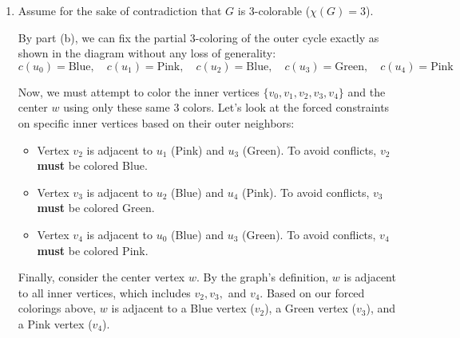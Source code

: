 \documentclass[11pt]{article}
\begin{document}
\begin{enumerate}[label=\textbf{(\alph*)}]
By utilizing the symmetry of the graph (rotating it), we can orient the $C_5$ such that the vertex assigned the unique color is placed at the bottom position ($u_3$). Let's designate this unique color as Green.

This leaves the remaining 4 vertices $(u_4, u_0, u_1, u_2)$ forming a path that must be colored using only the remaining 2 colors (Blue and Pink). To validly color a path with 2 colors, the colors must strictly alternate. This gives us exactly two possibilities for the path $(u_4, u_0, u_1, u_2)$:
\begin{enumerate}
    \item Pink $\to$ Blue $\to$ Pink $\to$ Blue
    \item Blue $\to$ Pink $\to$ Blue $\to$ Pink
\end{enumerate}
These two possibilities are mathematically identical and map directly to one another simply by relabeling (swapping) the names of "Blue" and "Pink". Therefore, up to rotation and relabeling, there is only one valid 3-coloring of the outer 5-cycle, which perfectly matches the partial coloring provided in the diagram.

\item Assume for the sake of contradiction that $G$ is 3-colorable ($\chi(G) = 3$). 

By part (b), we can fix the partial 3-coloring of the outer cycle exactly as shown in the diagram without any loss of generality:
$$c(u_0) = \text{Blue}, \quad c(u_1) = \text{Pink}, \quad c(u_2) = \text{Blue}, \quad c(u_3) = \text{Green}, \quad c(u_4) = \text{Pink}$$

Now, we must attempt to color the inner vertices $\{v_0, v_1, v_2, v_3, v_4\}$ and the center $w$ using only these same 3 colors. Let's look at the forced constraints on specific inner vertices based on their outer neighbors:
\begin{itemize}
    \item Vertex $v_2$ is adjacent to $u_1$ (Pink) and $u_3$ (Green). To avoid conflicts, $v_2$ \textbf{must} be colored Blue.
    \item Vertex $v_3$ is adjacent to $u_2$ (Blue) and $u_4$ (Pink). To avoid conflicts, $v_3$ \textbf{must} be colored Green.
    \item Vertex $v_4$ is adjacent to $u_0$ (Blue) and $u_3$ (Green). To avoid conflicts, $v_4$ \textbf{must} be colored Pink.
\end{itemize}

Finally, consider the center vertex $w$. By the graph's definition, $w$ is adjacent to all inner vertices, which includes $v_2, v_3,$ and $v_4$. 
Based on our forced colorings above, $w$ is adjacent to a Blue vertex ($v_2$), a Green vertex ($v_3$), and a Pink vertex ($v_4$). 


\end{enumerate}
\end{document}
